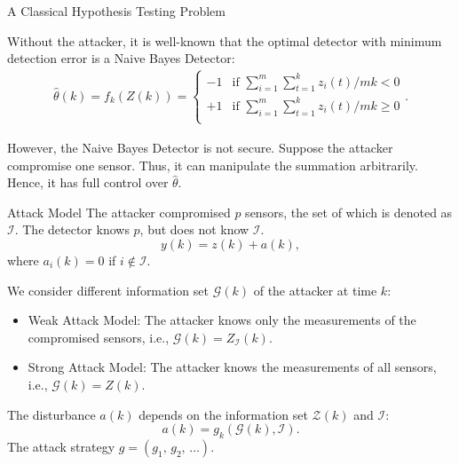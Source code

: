 \documentclass[10pt]{beamer}
\newlength\figureheight
\newlength\figurewidth
\newcommand{\tikzdir}[1]{#1.tikz}
\newcommand{\inputtikz}[1]{}}
\begin{document}
 \begin{frame}{A Classical Hypothesis Testing Problem}
   \begin{center}
     \setlength{\figureheight}{2cm}
     \setlength{\figurewidth}{10cm}
     \inputtikz{gaussian}
   \end{center}
   
   Without the attacker, it is well-known that the optimal detector with minimum detection error is a Naive Bayes Detector:
   \begin{align*}
     \hat \theta(k)=f_k(Z(k))=\begin{cases}
       -1 &\text{if }\sum_{i=1}^m\sum_{t=1}^k z_i(t)/mk < 0\\
       +1 &\text{if }\sum_{i=1}^m\sum_{t=1}^k z_i(t)/mk \geq 0\\
     \end{cases}.
   \end{align*}
   
   However, the Naive Bayes Detector is not secure. Suppose the attacker compromise one sensor. Thus, it can manipulate the summation arbitrarily. Hence, it has full control over $\hat \theta$. 
 \end{frame}
 
 
 \begin{frame}{Attack Model}
   The attacker compromised $p$ sensors, the set of which is denoted as $\mathcal I$. The detector knows $p$, but does not know $\mathcal I$.
   \begin{displaymath}
     y(k) = z(k) + a(k),  
   \end{displaymath}
   where $a_i(k) = 0$ if $i\notin \mathcal I$.
   
   We consider different information set $\mathcal G(k)$ of the attacker at time $k$:
   \begin{itemize}
   \item Weak Attack Model: The attacker knows only the measurements of the compromised sensors, i.e., $\mathcal G(k) = Z_{\mathcal I}(k)$.
   \item Strong Attack Model: The attacker knows the measurements of all sensors, i.e., $\mathcal G(k) = Z(k)$. 
   \end{itemize}
   The disturbance $a(k)$ depends on the information set $\mathcal Z(k)$ and $\mathcal I$: 
   \begin{displaymath}
     a(k) = g_k(\mathcal G(k),\mathcal I). 
   \end{displaymath}
   The attack strategy $g = (g_1,\,g_2,\,\dots)$.
 \end{frame}
 
\end{document}
